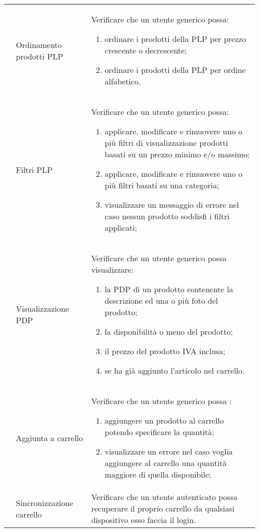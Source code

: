 \begin{center}
\begin{longtable}{p{1cm}|p{6.85cm}|p{7cm}|}
	 & Ordinamento prodotti PLP & Verificare che un utente generico possa: 
	\begin{enumerate}
		\item  ordinare i prodotti della PLP per prezzo crescente o decrescente;
		\item  ordinare i prodotti della PLP per ordine alfabetico.
	\end{enumerate} \\

	 & Filtri PLP & Verificare che un utente generico possa: 
	\begin{enumerate}
		\item  applicare, modificare e rimuovere uno o più filtri di visualizzazione prodotti basati su un prezzo minimo e/o massimo;
		\item  applicare, modificare e rimuovere uno o più filtri basati su una categoria;
		\item  visualizzare un messaggio di errore nel caso nessun prodotto soddisfi i filtri applicati;
	\end{enumerate} \\

	 & Visualizzazione PDP & Verificare che un utente generico possa visualizzare: 
	\begin{enumerate}
		\item   la PDP di un prodotto contenente la descrizione ed una o più foto del prodotto;
		\item   la disponibilità o meno del prodotto;
		\item   il prezzo del prodotto IVA inclusa;
		\item   se ha già aggiunto l'articolo nel carrello.
	\end{enumerate} \\

	 & Aggiunta a carrello & Verificare che un utente generico possa : 
	\begin{enumerate}
		\item   aggiungere un prodotto al carrello potendo specificare la quantità;
		\item   visualizzare un errore nel caso voglia aggiungere al carrello una quantità maggiore di quella disponibile;
	\end{enumerate} \\

	 & Sincronizzazione carrello & Verificare che un utente autenticato possa recuperare il proprio carrello da qualsiasi dispositivo esso faccia il login.\\


\end{longtable}
\end{center}
